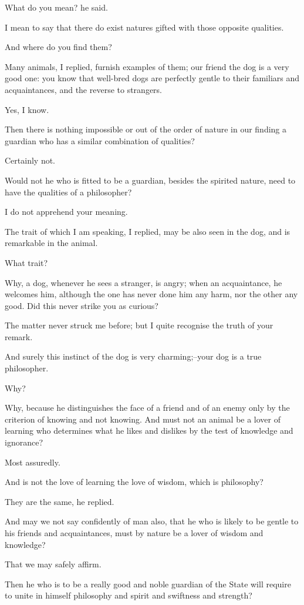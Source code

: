 What do you mean? he said.

I mean to say that there do exist natures gifted with those opposite
qualities.

And where do you find them?

Many animals, I replied, furnish examples of them; our friend the dog
is a very good one: you know that well-bred dogs are perfectly gentle to
their familiars and acquaintances, and the reverse to strangers.

Yes, I know.

Then there is nothing impossible or out of the order of nature in our
finding a guardian who has a similar combination of qualities?

Certainly not.

Would not he who is fitted to be a guardian, besides the spirited
nature, need to have the qualities of a philosopher?

I do not apprehend your meaning.

The trait of which I am speaking, I replied, may be also seen in the
dog, and is remarkable in the animal.

What trait?

Why, a dog, whenever he sees a stranger, is angry; when an acquaintance,
he welcomes him, although the one has never done him any harm, nor the
other any good. Did this never strike you as curious?

The matter never struck me before; but I quite recognise the truth of
your remark.

And surely this instinct of the dog is very charming;--your dog is a
true philosopher.

Why?

Why, because he distinguishes the face of a friend and of an enemy only
by the criterion of knowing and not knowing. And must not an animal be a
lover of learning who determines what he likes and dislikes by the test
of knowledge and ignorance?

Most assuredly.

And is not the love of learning the love of wisdom, which is philosophy?

They are the same, he replied.

And may we not say confidently of man also, that he who is likely to be
gentle to his friends and acquaintances, must by nature be a lover of
wisdom and knowledge?

That we may safely affirm.

Then he who is to be a really good and noble guardian of the State will
require to unite in himself philosophy and spirit and swiftness and
strength?

